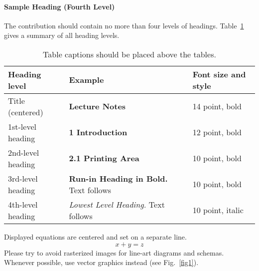 \documentclass[runningheads]{llncs}
\begin{document}
\paragraph{Sample Heading (Fourth Level)}
The contribution should contain no more than four levels of
headings. Table~\ref{tab1} gives a summary of all heading levels.

\begin{table}
\caption{Table captions should be placed above the
tables.}\label{tab1}
\begin{tabular}{|l|l|l|}
\hline
Heading level &  Example & Font size and style\\
\hline
Title (centered) &  {\Large\bfseries Lecture Notes} & 14 point, bold\\
1st-level heading &  {\large\bfseries 1 Introduction} & 12 point, bold\\
2nd-level heading & {\bfseries 2.1 Printing Area} & 10 point, bold\\
3rd-level heading & {\bfseries Run-in Heading in Bold.} Text follows & 10 point, bold\\
4th-level heading & {\itshape Lowest Level Heading.} Text follows & 10 point, italic\\
\hline
\end{tabular}
\end{table}


\noindent Displayed equations are centered and set on a separate
line.
\begin{equation}
x + y = z
\end{equation}
Please try to avoid rasterized images for line-art diagrams and
schemas. Whenever possible, use vector graphics instead (see
Fig.~\ref{fig1}).

\end{document}
